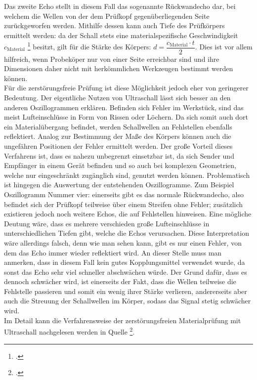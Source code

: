 \documentclass[reducespace,stylepage,semiarbeit]{spezidoc}
\begin{document}
Das zweite Echo stellt in diesem Fall das sogenannte Rückwandecho dar, bei welchem die Wellen von der dem Prüfkopf gegenüberliegenden Seite zurückgeworfen werden. 
Mithilfe dessen kann auch Tiefe des Prüfkörpers ermittelt werden: da der Schall stets eine materialspezifische Geschwindigkeit $c_\mathrm{Material}$  \footcite{schallgeschwindigkeiten}  %
besitzt, gilt für die Stärke des Körpers: $d = \dfrac{c_{\mathrm{Material}} \cdot t}{2}$. 
Dies ist vor allem hilfreich, wenn Probeköper nur von einer Seite erreichbar sind und ihre Dimensionen daher nicht mit herkömmlichen Werkzeugen bestimmt werden können.\\
Für die zerstörungsfreie Prüfung ist diese Möglichkeit jedoch eher von geringerer Bedeutung. 
Der eigentliche Nutzen von Ultraschall lässt sich besser an den anderen Oszillogrammen erklären. 
Befinden sich Fehler im Werkstück, sind das meist Lufteinschlüsse in Form von Rissen oder Löchern. 
Da sich somit auch dort ein Materialübergang befindet, werden Schallwellen an Fehlstellen ebenfalls reflektiert. 
Analog zur Bestimmung der Maße des Körpers können auch die ungefähren Positionen der Fehler ermittelt werden. 
Der große Vorteil dieses Verfahrens ist, dass es nahezu unbegrenzt einsetzbar ist, da sich Sender und Empfänger in einem Gerät befinden und so auch bei komplexen Geometrien, welche nur eingeschränkt zugänglich sind, genutzt werden können. 
Problematisch ist hingegen die Auswertung der entstehenden Oszillogramme. 
Zum Beispiel Oszillogramm Nummer vier: einerseits gibt es das normale Rückwandecho, also befindet sich der Prüfkopf teilweise über einem Streifen ohne Fehler; zusätzlich existieren jedoch noch weitere Echos, die auf Fehlstellen hinweisen. 
Eine mögliche Deutung wäre, dass es mehrere verschieden große Lufteinschlüsse in unterschiedlichen Tiefen gibt, welche die Echos verursachen. 
Diese Interpretation wäre allerdings falsch, denn wie man sehen kann, gibt es nur einen Fehler, von dem das Echo immer wieder reflektiert wird. 
An dieser Stelle muss man anmerken, dass in diesem Fall kein gutes Kopplungsmittel verwendet wurde, da sonst das Echo sehr viel schneller abschwächen würde. 
Der Grund dafür, dass es dennoch schwächer wird, ist einerseits der Fakt, dass die Wellen teilweise die Fehlstelle passieren und somit ein wenig ihrer Stärke verlieren, andererseits aber auch die Streuung der Schallwellen im Körper, sodass das Signal stetig schwächer wird.\\
Im Detail kann die Verfahrensweise der zerstörungsfreien Materialprüfung mit Ultraschall nachgelesen werden in Quelle 
\footcite{karldeutsch}. 
\end{document}
